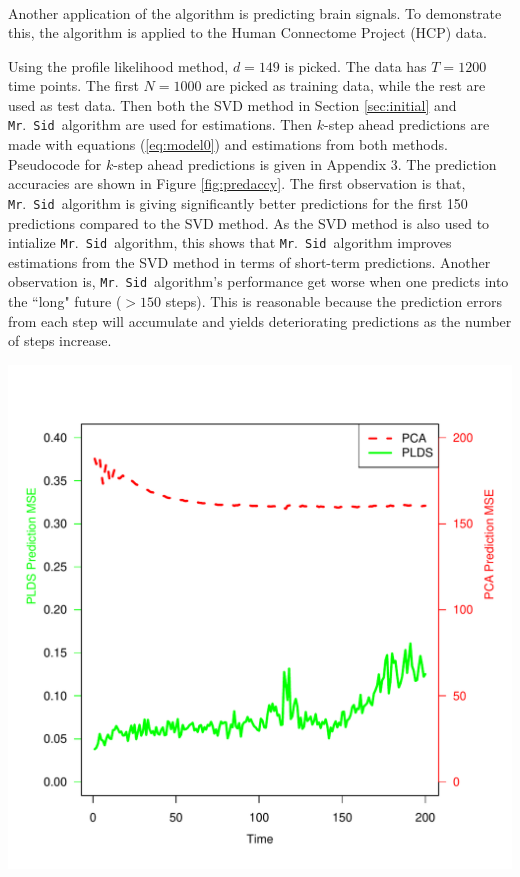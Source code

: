 \documentclass[fleqn]{article}
\let\oldref\ref
\renewcommand{\ref}[1]{(\oldref{#1})}
\newcommand{\mrsid}{{\sc \texttt{Mr}.~\texttt{Sid}}}
\begin{document}
\begin{center}
\[\begin{array}{lll}
\end{array}
\]
\label{fig:3d}
\end{center}

Another application of the algorithm is predicting brain signals. To demonstrate this, the algorithm is applied to the Human Connectome Project (HCP) data.

Using the profile likelihood method, $d=149$ is picked. The data has $T=1200$ time points. The first $N = 1000$ are picked as training data, while the rest are used as test data. Then both the SVD method in Section \oldref{sec:initial} and \mrsid~algorithm are used for estimations. Then $k$-step ahead predictions are made with equations \ref{eq:model0} and estimations from both methods. Pseudocode for $k$-step ahead predictions is given in Appendix 3. The prediction accuracies are shown in Figure \oldref{fig:predaccy}. The first observation is that, \mrsid~algorithm is giving significantly better predictions for the first 150 predictions compared to the SVD method. As the SVD method is also used to intialize \mrsid~algorithm, this shows that \mrsid~algorithm improves estimations from the SVD method in terms of short-term predictions. Another observation is, \mrsid~algorithm's performance get worse when one predicts into the ``long" future ($>150$ steps). This is reasonable because the prediction errors from each step will accumulate and yields deteriorating predictions as the number of steps increase.

\begin{center}
\includegraphics[scale=0.5]{./figures/hcp_pred_accy.pdf}
\label{fig:predaccy}
\end{center}
\end{document}

